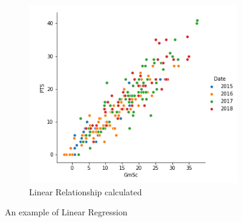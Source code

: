 \documentclass[a4paper,11pt,twoside]{article}
\begin{document}
\begin{figure} [h!]
\begin{subfigure}[b]{0.4\textwidth}
    \includegraphics[width=\textwidth]{pairplot2.png}
    \caption{Linear Relationship calculated}
    \label{fig:2}
  \end{subfigure}
  \caption{An example of Linear Regression}
  \label{fig:3}
\end{figure}
\end{document}
